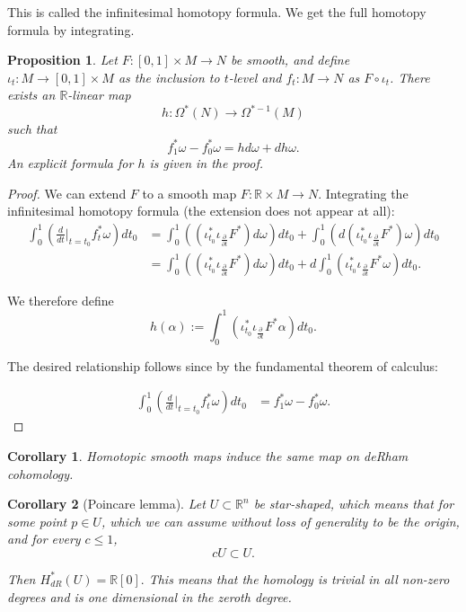 \documentclass[12pt]{amsart}
\newtheorem{proposition}{Proposition}
\newtheorem{corollary}{Corollary}
\theoremstyle{remark}
\begin{document}
This is called the infinitesimal homotopy formula. We get the full homotopy formula by integrating.


\begin{proposition}
Let $F:[0,1]\times M\to N$ be smooth, and define $\iota_t:M\to [0,1]\times M$ as the inclusion to $t$-level and $f_t:M\to N$ as $F\circ\iota_t$. There exists an $\mathbb{R}$-linear map $$h:\Omega^*(N)\to\Omega^{*-1}(M)$$ such that $$f_1^*\omega-f_0^*\omega=hd\omega+dh\omega.$$
An explicit formula for $h$ is given in the proof.
\end{proposition}
\begin{proof}
We can extend $F$ to a smooth map $F:\mathbb{R}\times M\to N.$ 
Integrating the infinitesimal homotopy formula (the extension does not appear at all): 
\begin{align*}
\int_{0}^{1}\left(\frac{d}{dt}|_{t=t_0}f_t^*\omega\right) dt_0&=\int_{0}^{1}\left((\iota_{t_0}^*\iota_{\frac{\partial}{\partial t}}F^*)d\omega\right) dt_0+\int_{0}^{1}\left(d(\iota_{t_0}^*\iota_{\frac{\partial}{\partial t}}F^*)\omega\right) dt_0\\&=\int_{0}^{1}\left((\iota_{t_0}^*\iota_{\frac{\partial}{\partial t}}F^*)d\omega\right) dt_0+d\int_{0}^{1}\left(\iota_{t_0}^*\iota_{\frac{\partial}{\partial t}}F^*\omega\right) dt_0.
\end{align*}

We therefore define $$h(\alpha):=\int_{0}^{1}\left(\iota_{t_0}^*\iota_{\frac{\partial}{\partial t}}F^*\alpha\right) dt_0.$$

The desired relationship follows since by the fundamental theorem of calculus:

\begin{align*}
\int_{0}^{1}\left(\frac{d}{dt}|_{t=t_0}f_t^*\omega\right) dt_0&=f_1^*\omega-f_0^*\omega.
\end{align*}
\end{proof}

\begin{corollary} 
Homotopic smooth maps induce the same map on deRham cohomology.
\end{corollary}

\begin{corollary}[Poincare lemma]
Let $U\subset \mathbb{R}^n$ be star-shaped, which means that for some point $p\in U$, which we can assume without loss of generality to be the origin, and for every $c\leq 1$, $$cU\subset U.$$

Then $H^*_{dR}(U)=\mathbb{R}[0].$ This means that the homology is trivial in all non-zero degrees and is one dimensional in the zeroth degree.
\end{corollary}
\end{document}
